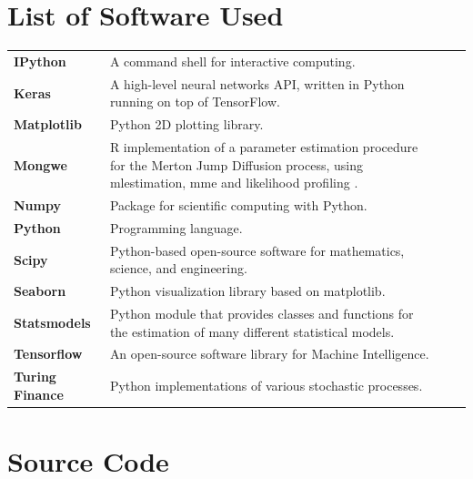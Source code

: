 \documentclass[11pt,oneside,openany,a4paper,english, report, goldenblock
]{usthesis}
\begin{document}
\chapter[Appendix D]{List of Software Used}
\label{list_of_software_used}
\def\arraystretch{2}
\begin{tabular}[h]{l p{9cm} ll}
	
	\textbf{IPython} & A command shell for interactive computing. &\cite{ipython} \\ 
	
	\textbf{Keras} & A high-level neural networks API, written in Python running on top of TensorFlow. &\cite{chollet2015keras} \\ 
	
	\textbf{Matplotlib} & Python 2D plotting library. &\cite{matplotlib} \\ 
	
	\textbf{Mongwe} & R implementation of a parameter estimation procedure for the Merton Jump Diffusion process, using \acrshort{mlestimation}, \acrshort{mme} and likelihood profiling \citep{Honore}. & \cite{Mongwe} \\ 
	
	\textbf{Numpy} & Package for scientific computing with Python. &\cite{numpy} \\ 
	
	\textbf{Python} & Programming language. & \cite{python} \\ 
	
	\textbf{Scipy} & Python-based open-source software for mathematics, science, and engineering. &\cite{scipy} \\ 
	
	\textbf{Seaborn} & Python visualization library based on matplotlib. &\cite{seaborn} \\ 
	
	\textbf{Statsmodels} & Python module that provides classes and functions for the estimation of many different statistical models. &\cite{statsmodels} \\ 
	
	\textbf{Tensorflow} & An open-source software library for Machine Intelligence. & \cite{tensorflow2015-whitepaper} \\ 
	
	\textbf{Turing Finance} & Python implementations of various stochastic processes. & \cite{reid} \\ 
 
\end{tabular} 

\chapter[Appendix E]{Source Code}
\label{appendix:source_code}
\end{document}
